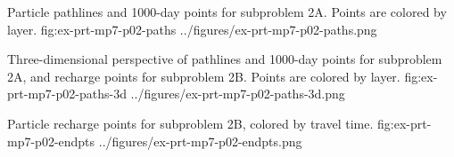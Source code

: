 \begin{StandardFigure}{
	Particle pathlines and 1000-day points for subproblem 2A. Points are colored by layer.
}
	{fig:ex-prt-mp7-p02-paths}
	{../figures/ex-prt-mp7-p02-paths.png}
\end{StandardFigure}

\begin{StandardFigure}{
	Three-dimensional perspective of pathlines and 1000-day points for subproblem 2A, and recharge points for subproblem 2B. Points are colored by layer.
}
	{fig:ex-prt-mp7-p02-paths-3d}
	{../figures/ex-prt-mp7-p02-paths-3d.png}
\end{StandardFigure}

\begin{StandardFigure}{
	Particle recharge points for subproblem 2B, colored by travel time.
}
	{fig:ex-prt-mp7-p02-endpts}
	{../figures/ex-prt-mp7-p02-endpts.png}
\end{StandardFigure}
